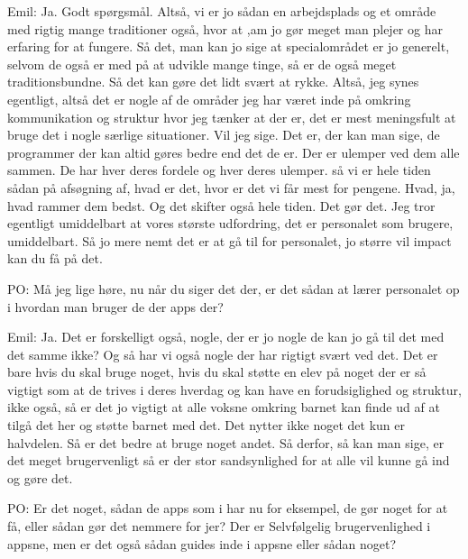 Emil:
Ja. 
Godt spørgsmål.
Altså, vi er jo sådan en arbejdsplads og et område med rigtig mange traditioner også, hvor at ,am jo gør meget man plejer og har erfaring for at fungere. 
Så det, man kan jo sige at specialområdet er jo generelt, selvom de også er med på at udvikle mange tinge, så er de også meget traditionsbundne. 
Så det kan gøre det lidt svært at rykke.
Altså, jeg synes egentligt, altså det er nogle af de områder jeg har været inde på omkring kommunikation og struktur hvor jeg tænker at der er, det er mest meningsfult at bruge det i nogle særlige situationer.
Vil jeg sige.
Det er, der kan man sige, de programmer der kan altid gøres bedre end det de er. 
Der er ulemper ved dem alle sammen. 
De har hver deres fordele og hver deres ulemper.
så vi er hele tiden sådan på afsøgning af, hvad er det, hvor er det vi får mest for pengene.
Hvad, ja, hvad rammer dem bedst.
Og det skifter også hele tiden.
Det gør det.
Jeg tror egentligt umiddelbart at vores største udfordring, det er personalet som brugere, umiddelbart.
Så jo mere nemt det er at gå til for personalet, jo større vil impact kan du få på det.

PO:
Må jeg lige høre, nu når du siger det der, er det sådan at lærer personalet op i hvordan man bruger de der apps der?

Emil:
Ja.
Det er forskelligt også, nogle, der er jo nogle de kan jo gå til det med det samme ikke? 
Og så har vi også nogle der har rigtigt svært ved det.
Det er bare hvis du skal bruge noget, hvis du skal støtte en elev på noget der er så vigtigt som at de trives i deres hverdag og kan have en forudsiglighed og struktur, ikke også, så er det jo vigtigt at alle voksne omkring barnet kan finde ud af at tilgå det her og støtte barnet med det.
Det nytter ikke noget det kun er halvdelen.
Så er det bedre at bruge noget andet.
Så derfor, så kan man sige, er det meget brugervenligt så er der stor sandsynlighed for at alle vil kunne gå ind og gøre det.

PO:
Er det noget, sådan de apps som i har nu for eksempel, de gør noget for at få, eller sådan gør det nemmere for jer?
Der er Selvfølgelig brugervenlighed i appsne, men er det også sådan guides inde i appsne eller sådan noget?

